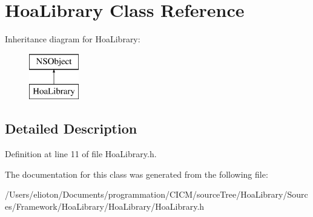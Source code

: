 \hypertarget{interface_hoa_library}{\section{Hoa\-Library Class Reference}
\label{interface_hoa_library}
}
Inheritance diagram for Hoa\-Library\-:\begin{figure}[H]
\begin{center}
\leavevmode
\includegraphics[height=2.000000cm]{interface_hoa_library}
\end{center}
\end{figure}


\subsection{Detailed Description}


Definition at line 11 of file Hoa\-Library.\-h.



The documentation for this class was generated from the following file\-:\begin{DoxyCompactItemize}
\item 
/\-Users/elioton/\-Documents/programmation/\-C\-I\-C\-M/source\-Tree/\-Hoa\-Library/\-Sources/\-Framework/\-Hoa\-Library/\-Hoa\-Library/Hoa\-Library.\-h\end{DoxyCompactItemize}

